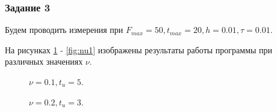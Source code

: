 \documentclass[a4paper,14pt]{article}
\begin{document}
\subsubsection*{Задание 3}

Будем проводить измерения при $F_{max} = 50, t_{max} = 20, h = 0.01, \tau = 0.01$.

На рисунках \ref{fig:nu10} - \ref{fig:nu1} изображены результаты работы программы
при различных значениях $\nu$.

\newpage
\begin{figure}[!h]
	\caption{$\nu = 0.1, t_u = 5$.}
	\label{fig:nu10}
\end{figure}

\newpage
\begin{figure}[!h]
	\caption{$\nu = 0.2, t_u = 3$.}
	\label{fig:nu5}
\end{figure}
\end{document}
